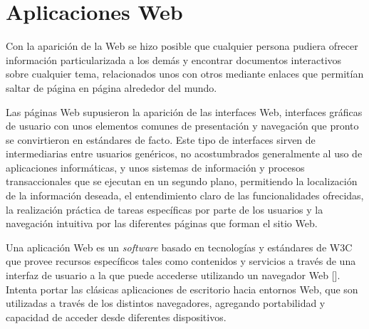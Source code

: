 
\section{Aplicaciones Web}
Con la aparición de la Web se hizo posible que cualquier persona pudiera ofrecer información particularizada a los demás y encontrar documentos interactivos sobre cualquier tema, relacionados unos con otros mediante enlaces que permitían saltar de página en página alrededor del mundo.

Las páginas Web supusieron la aparición de las interfaces Web, interfaces gráficas de usuario con unos elementos comunes de presentación y navegación que pronto se convirtieron en estándares de facto. Este tipo de interfaces sirven de intermediarias entre usuarios genéricos, no acostumbrados generalmente al uso de aplicaciones informáticas, y unos sistemas de información y procesos transaccionales que se ejecutan en un segundo plano, permitiendo la localización de la información deseada, el entendimiento claro de las funcionalidades ofrecidas, la realización práctica de tareas específicas por parte de los usuarios y la navegación intuitiva por las diferentes páginas que forman el sitio Web.

Una aplicación Web es un \textit{software} basado en tecnologías y estándares de W3C que provee recursos específicos tales como contenidos y servicios a través de una interfaz de usuario a la que puede accederse utilizando un navegador Web [\cite{100}]. Intenta portar las clásicas aplicaciones de escritorio hacia entornos Web, que son utilizadas a través de los distintos navegadores, agregando portabilidad y capacidad de acceder desde diferentes dispositivos.

